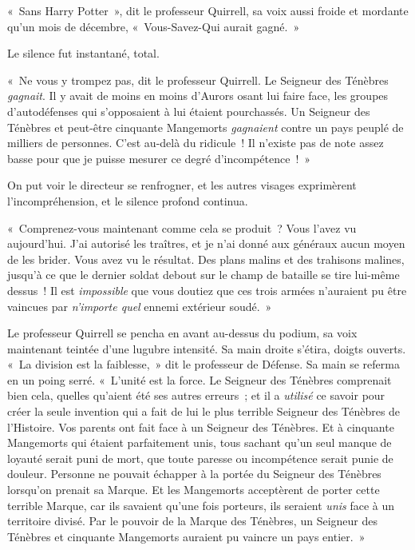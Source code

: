 «~Sans Harry Potter~», dit le professeur Quirrell, sa voix aussi froide et mordante qu'un mois de décembre, «~Vous-Savez-Qui aurait gagné.~»

Le silence fut instantané, total.

\later

«~Ne vous y trompez pas, dit le professeur Quirrell.
Le Seigneur des Ténèbres \emph{gagnait}.
Il y avait de moins en moins d'Aurors osant lui faire face, les groupes d'autodéfenses qui s'opposaient à lui étaient pourchassés.
Un Seigneur des Ténèbres et peut-être cinquante Mangemorts \emph{gagnaient} contre un pays peuplé de milliers de personnes.
C'est au-delà du ridicule~!
Il n'existe pas de note assez basse pour que je puisse mesurer ce degré d'incompétence~!~»

On put voir le directeur se renfrogner, et les autres visages exprimèrent l'incompréhension, et le silence profond continua.

«~Comprenez-vous maintenant comme cela se produit~?
Vous l'avez vu aujourd'hui.
J'ai autorisé les traîtres, et je n'ai donné aux généraux aucun moyen de les brider.
Vous avez vu le résultat.
Des plans malins et des trahisons malines, jusqu'à ce que le dernier soldat debout sur le champ de bataille se tire lui-même dessus~!
Il est \emph{impossible} que vous doutiez que ces trois armées n'auraient pu être vaincues par \emph{n'importe quel} ennemi extérieur soudé.~»

Le professeur Quirrell se pencha en avant au-dessus du podium, sa voix maintenant teintée d'une lugubre intensité.
Sa main droite s'étira, doigts ouverts.
«~La division est la faiblesse,~» dit le professeur de Défense.
Sa main se referma en un poing serré.
«~L'unité est la force.
Le Seigneur des Ténèbres comprenait bien cela, quelles qu'aient été ses autres erreurs~; et il a \emph{utilisé} ce savoir pour créer la seule invention qui a fait de lui le plus terrible Seigneur des Ténèbres de l'Histoire.
Vos parents ont fait face à un Seigneur des Ténèbres.
Et à cinquante Mangemorts qui étaient parfaitement unis, tous sachant qu'un seul manque de loyauté serait puni de mort, que toute paresse ou incompétence serait punie de douleur.
Personne ne pouvait échapper à la portée du Seigneur des Ténèbres lorsqu'on prenait sa Marque.
Et les Mangemorts acceptèrent de porter cette terrible Marque, car ils savaient qu'une fois porteurs, ils seraient \emph{unis} face à un territoire divisé.
Par le pouvoir de la Marque des Ténèbres, un Seigneur des Ténèbres et cinquante Mangemorts auraient pu vaincre un pays entier.~»

